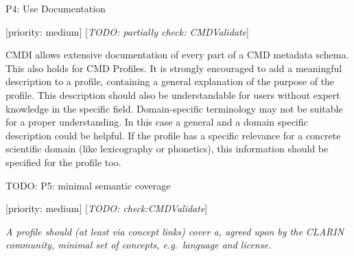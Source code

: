 \documentclass[]{article}
\begin{document}
P4: Use Documentation

{[}priority: medium{]} {[}\emph{TODO: partially check: CMDValidate}{]}

CMDI allows extensive documentation of every part of a CMD metadata
schema. This also holds for CMD Profiles. It is strongly encouraged to
add a meaningful description to a profile, containing a general
explanation of the purpose of the profile. This description should also
be understandable for users without expert knowledge in the specific
field. Domain-specific terminology may not be suitable for a proper
understanding. In this case a general and a domain specific description
could be helpful. If the profile has a specific relevance for a concrete
scientific domain (like lexicography or phonetics), this information
should be specified for the profile too.

TODO: P5: minimal semantic coverage

{[}priority: medium{]} {[}\emph{TODO: check:CMDValidate}{]}

\emph{A profile should (at least via concept links) cover a, agreed upon
by the CLARIN community, minimal set of concepts, e.g.~language and
license.}
\end{document}
